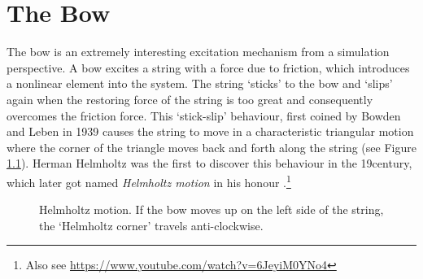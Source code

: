 \chapter{The Bow}\label{ch:bow}
The bow is an extremely interesting excitation mechanism from a simulation perspective.
A bow excites a string with a force due to friction, which introduces a nonlinear element into the system.
The string `sticks' to the bow and `slips' again when the restoring force of the string is too great and consequently overcomes the friction force. This `stick-slip' behaviour, first coined by Bowden and Leben in 1939 \cite{Bowden1939} causes the string to move in a characteristic triangular motion where the corner of the triangle moves back and forth along the string (see Figure \ref{fig:helmholtz}). Herman Helmholtz was the first to discover this behaviour in the 19\th century, which later got named \textit{Helmholtz motion} in his honour \cite{Helmholtz1860}.\footnote{Also see \url{https://www.youtube.com/watch?v=6JeyiM0YNo4}}

\begin{figure}[h]
    \centering
    \caption{Helmholtz motion. If the bow moves up on the left side of the string, the `Helmholtz corner' travels anti-clockwise. \label{fig:helmholtz}}
\end{figure}

